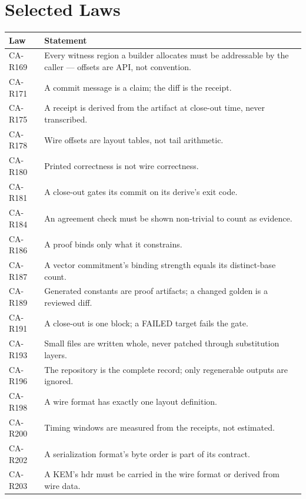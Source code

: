 \documentclass[11pt, a4paper]{article}
\begin{document}
\section{Selected Laws}

\begin{longtable}{p{2cm} p{13cm}}
\toprule
\textbf{Law} & \textbf{Statement} \\
\midrule
\endhead
CA-R169 & Every witness region a builder allocates must be addressable by the caller --- offsets are API, not convention. \\
CA-R171 & A commit message is a claim; the diff is the receipt. \\
CA-R175 & A receipt is derived from the artifact at close-out time, never transcribed. \\
CA-R178 & Wire offsets are layout tables, not tail arithmetic. \\
CA-R180 & Printed correctness is not wire correctness. \\
CA-R181 & A close-out gates its commit on its derive's exit code. \\
CA-R184 & An agreement check must be shown non-trivial to count as evidence. \\
CA-R186 & A proof binds only what it constrains. \\
CA-R187 & A vector commitment's binding strength equals its distinct-base count. \\
CA-R189 & Generated constants are proof artifacts; a changed golden is a reviewed diff. \\
CA-R191 & A close-out is one block; a FAILED target fails the gate. \\
CA-R193 & Small files are written whole, never patched through substitution layers. \\
CA-R196 & The repository is the complete record; only regenerable outputs are ignored. \\
CA-R198 & A wire format has exactly one layout definition. \\
CA-R200 & Timing windows are measured from the receipts, not estimated. \\
CA-R202 & A serialization format's byte order is part of its contract. \\
CA-R203 & A KEM's hdr must be carried in the wire format or derived from wire data. \\
\bottomrule
\end{longtable}
\end{document}
